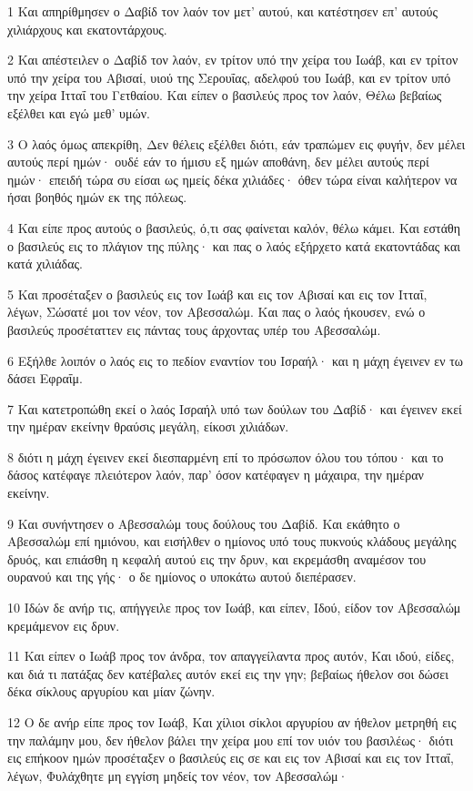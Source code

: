 \par 1 Και απηρίθμησεν ο Δαβίδ τον λαόν τον μετ' αυτού, και κατέστησεν επ' αυτούς χιλιάρχους και εκατοντάρχους.
\par 2 Και απέστειλεν ο Δαβίδ τον λαόν, εν τρίτον υπό την χείρα του Ιωάβ, και εν τρίτον υπό την χείρα του Αβισαί, υιού της Σερουΐας, αδελφού του Ιωάβ, και εν τρίτον υπό την χείρα Ιτταΐ του Γετθαίου. Και είπεν ο βασιλεύς προς τον λαόν, Θέλω βεβαίως εξέλθει και εγώ μεθ' υμών.
\par 3 Ο λαός όμως απεκρίθη, Δεν θέλεις εξέλθει διότι, εάν τραπώμεν εις φυγήν, δεν μέλει αυτούς περί ημών· ουδέ εάν το ήμισυ εξ ημών αποθάνη, δεν μέλει αυτούς περί ημών· επειδή τώρα συ είσαι ως ημείς δέκα χιλιάδες· όθεν τώρα είναι καλήτερον να ήσαι βοηθός ημών εκ της πόλεως.
\par 4 Και είπε προς αυτούς ο βασιλεύς, ό,τι σας φαίνεται καλόν, θέλω κάμει. Και εστάθη ο βασιλεύς εις το πλάγιον της πύλης· και πας ο λαός εξήρχετο κατά εκατοντάδας και κατά χιλιάδας.
\par 5 Και προσέταξεν ο βασιλεύς εις τον Ιωάβ και εις τον Αβισαί και εις τον Ιτταΐ, λέγων, Σώσατέ μοι τον νέον, τον Αβεσσαλώμ. Και πας ο λαός ήκουσεν, ενώ ο βασιλεύς προσέταττεν εις πάντας τους άρχοντας υπέρ του Αβεσσαλώμ.
\par 6 Εξήλθε λοιπόν ο λαός εις το πεδίον εναντίον του Ισραήλ· και η μάχη έγεινεν εν τω δάσει Εφραΐμ.
\par 7 Και κατετροπώθη εκεί ο λαός Ισραήλ υπό των δούλων του Δαβίδ· και έγεινεν εκεί την ημέραν εκείνην θραύσις μεγάλη, είκοσι χιλιάδων.
\par 8 διότι η μάχη έγεινεν εκεί διεσπαρμένη επί το πρόσωπον όλου του τόπου· και το δάσος κατέφαγε πλειότερον λαόν, παρ' όσον κατέφαγεν η μάχαιρα, την ημέραν εκείνην.
\par 9 Και συνήντησεν ο Αβεσσαλώμ τους δούλους του Δαβίδ. Και εκάθητο ο Αβεσσαλώμ επί ημιόνου, και εισήλθεν ο ημίονος υπό τους πυκνούς κλάδους μεγάλης δρυός, και επιάσθη η κεφαλή αυτού εις την δρυν, και εκρεμάσθη αναμέσον του ουρανού και της γής· ο δε ημίονος ο υποκάτω αυτού διεπέρασεν.
\par 10 Ιδών δε ανήρ τις, απήγγειλε προς τον Ιωάβ, και είπεν, Ιδού, είδον τον Αβεσσαλώμ κρεμάμενον εις δρυν.
\par 11 Και είπεν ο Ιωάβ προς τον άνδρα, τον απαγγείλαντα προς αυτόν, Και ιδού, είδες, και διά τι πατάξας δεν κατέβαλες αυτόν εκεί εις την γην; βεβαίως ήθελον σοι δώσει δέκα σίκλους αργυρίου και μίαν ζώνην.
\par 12 Ο δε ανήρ είπε προς τον Ιωάβ, Και χίλιοι σίκλοι αργυρίου αν ήθελον μετρηθή εις την παλάμην μου, δεν ήθελον βάλει την χείρα μου επί τον υιόν του βασιλέως· διότι εις επήκοον ημών προσέταξεν ο βασιλεύς εις σε και εις τον Αβισαί και εις τον Ιτταΐ, λέγων, Φυλάχθητε μη εγγίση μηδείς τον νέον, τον Αβεσσαλώμ·
